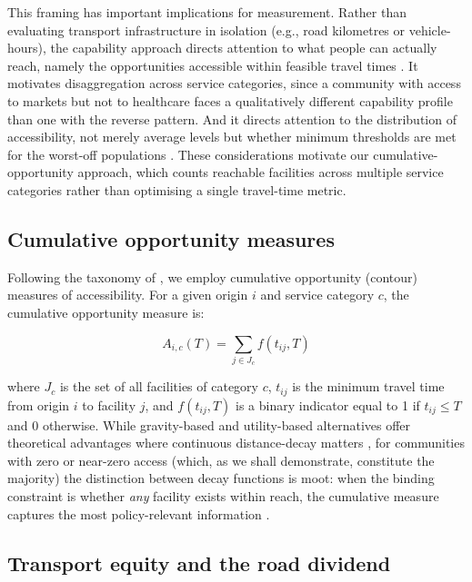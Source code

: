 \documentclass[review,3p,authoryear]{elsarticle}
\begin{document}
This framing has important implications for measurement. Rather than evaluating transport infrastructure in isolation (e.g., road kilometres or vehicle-hours), the capability approach directs attention to what people can actually reach, namely the opportunities accessible within feasible travel times \citep{lucas2012, martens2016}. It motivates disaggregation across service categories, since a community with access to markets but not to healthcare faces a qualitatively different capability profile than one with the reverse pattern. And it directs attention to the distribution of accessibility, not merely average levels but whether minimum thresholds are met for the worst-off populations \citep{lucas2016}. These considerations motivate our cumulative-opportunity approach, which counts reachable facilities across multiple service categories rather than optimising a single travel-time metric.

\subsection{Cumulative opportunity measures}

Following the taxonomy of \citet{geurs2004}, we employ cumulative opportunity (contour) measures of accessibility. For a given origin $i$ and service category $c$, the cumulative opportunity measure is:

\begin{equation}
A_{i,c}(T) = \sum_{j \in J_c} f(t_{ij}, T)
\label{eq:cumulative}
\end{equation}

\noindent where $J_c$ is the set of all facilities of category $c$, $t_{ij}$ is the minimum travel time from origin $i$ to facility $j$, and $f(t_{ij}, T)$ is a binary indicator equal to 1 if $t_{ij} \leq T$ and 0 otherwise. While gravity-based and utility-based alternatives offer theoretical advantages where continuous distance-decay matters \citep{kwan1998, paez2012}, for communities with zero or near-zero access (which, as we shall demonstrate, constitute the majority) the distinction between decay functions is moot: when the binding constraint is whether \textit{any} facility exists within reach, the cumulative measure captures the most policy-relevant information \citep{boisjoly2017}.

\subsection{Transport equity and the road dividend}
\end{document}
